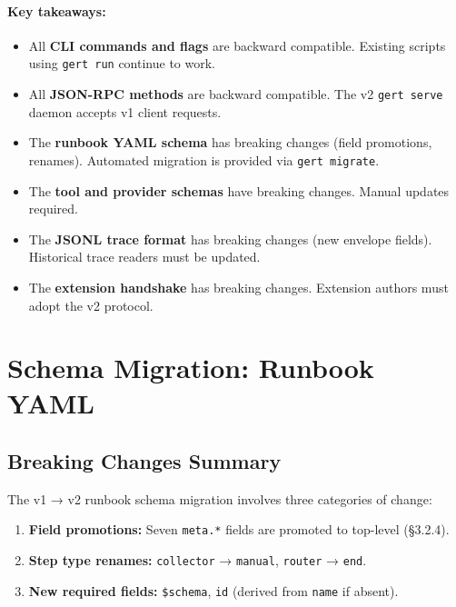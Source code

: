 \paragraph{Key takeaways:}
\begin{itemize}
  \item All \textbf{CLI commands and flags} are backward compatible. Existing scripts using \texttt{gert run} continue to work.
  \item All \textbf{JSON-RPC methods} are backward compatible. The v2 \texttt{gert serve} daemon accepts v1 client requests.
  \item The \textbf{runbook YAML schema} has breaking changes (field promotions, renames). Automated migration is provided via \texttt{gert migrate}.
  \item The \textbf{tool and provider schemas} have breaking changes. Manual updates required.
  \item The \textbf{JSONL trace format} has breaking changes (new envelope fields). Historical trace readers must be updated.
  \item The \textbf{extension handshake} has breaking changes. Extension authors must adopt the v2 protocol.
\end{itemize}

\section{Schema Migration: Runbook YAML}
\label{sec:runbook-migration}

\subsection{Breaking Changes Summary}

The v1 → v2 runbook schema migration involves three categories of change:

\begin{enumerate}
  \item \textbf{Field promotions:} Seven \texttt{meta.*} fields are promoted to top-level (§3.2.4).
  \item \textbf{Step type renames:} \texttt{collector} → \texttt{manual}, \texttt{router} → \texttt{end}.
  \item \textbf{New required fields:} \texttt{\$schema}, \texttt{id} (derived from \texttt{name} if absent).
\end{enumerate}

